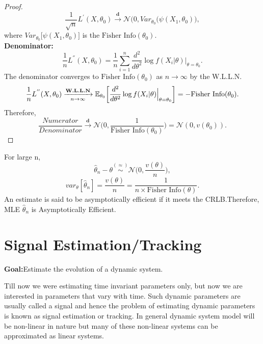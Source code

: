 \documentclass[a4paper,english,12pt]{article}
\begin{document}
\begin{proof}
\begin{equation}
    \frac{1}{\sqrt{n}}L^{'}(X,\theta_0)\xrightarrow{\textbf{d}}\mathcal{N}\big(0,Var_{\theta_0}(\psi(X_1,\theta_0)\big),
\end{equation}
where $Var_{\theta_0}\big[\psi(X_1,\theta_0)\big]$ is the $\text{Fisher Info}(\theta_0)$.\\
\textbf{Denominator:}\\
\begin{equation}
    \frac{1}{n}L^{''}(X,\theta_0)=\frac{1}{n}\sum_{i=1}^{n}\frac{d^2}{d\theta^2}\log f(X_i|\theta)\Big|_{\theta=\theta_0}.
\end{equation}
The  denominator converges to  $\text{Fisher Info}(\theta_0)$ as $n\to\infty$ by the W.L.L.N.
\begin{equation}
     \frac{1}{n}L^{''}(X,\theta_0)\xrightarrow[n\to{\infty}]{\textbf{W.L.L.N}}\mathbb{E}_{\theta_0}\bigg[\frac{d^2}{d\theta^2}\log f(X_i|\theta)\Big|_{\theta=\theta_0}\bigg]= -\text{Fisher Info}(\theta_0).
\end{equation}
Therefore,\\
\begin{equation}
    \frac{Numerator}{Denominator}\xrightarrow{\textbf{d}}\mathcal{N}\Big(0,\frac{1}{\text{Fisher Info}(\theta_0)}\Big)=\mathcal{N}(0,v(\theta_0)).
\end{equation}
\end{proof}
\begin{rem}
For large n,
\begin{equation}
\hat{\theta}_n-\theta \overset{(\approx)}{\sim} \mathcal{N}\bigg(0,\frac{v(\theta)}{n}\bigg),
\end{equation}
\begin{equation}
 var_\theta[\hat{\theta}_n]=\frac{v(\theta)}{n}=\frac{1}{n \times \text{Fisher Info}(\theta)}.
\end{equation}
An estimate is said to be asymptotically efficient if it meets the CRLB.Therefore, MLE $\hat{\theta}_n$ is Asymptotically Efficient.
\end{rem}
\section{Signal Estimation/Tracking}
\textbf{Goal:}Estimate the evolution of a dynamic system.\\
\par Till now we were estimating time invariant parameters only, but now we are interested in parameters that vary with time. Such dynamic parameters are usually called a signal and hence the problem of estimating dynamic parameters is known as signal estimation or tracking. In general dynamic system model will be non-linear in nature but many of these non-linear systems can be approximated as linear systems.
\end{document}
